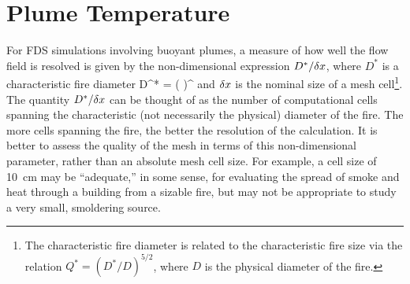 \chapter{Plume Temperature}

For FDS simulations involving buoyant plumes, a measure of how well the flow field is resolved is given by the
non-dimensional expression $D^*/\delta x$, where $D^*$ is a characteristic
fire diameter
\be D^* = \left(
     \right)^  \ee
and $\delta x$ is the nominal size of a mesh cell\footnote{The characteristic
fire diameter is related to the characteristic fire size via the
relation $Q^* = (D^*/D)^{5/2}$, where $D$ is the physical diameter of the
fire.}. The quantity $D^*/\delta x$ can be thought of as the number of computational cells
spanning the characteristic (not necessarily the physical) diameter of the fire.
The more cells spanning the fire, the better the resolution of the
calculation. It is better to assess the quality of the mesh in terms
of this non-dimensional parameter, rather than an absolute mesh cell size.
For example, a cell size of 10~cm may be ``adequate,'' in some sense,
for evaluating the spread of smoke and heat through a building from a
sizable fire, but may not be appropriate to study a very small, smoldering source.



%
%


